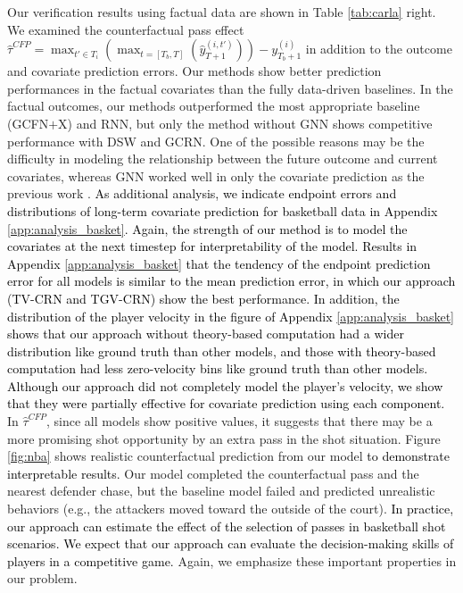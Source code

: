\documentclass[journal]{IEEEtran}
\begin{document}
Our verification results using factual data are shown in Table \ref{tab:carla} right.
We examined the counterfactual pass effect $\hat{\tau}^{CFP} = \max_{t'\in T_i}(\max_{t=[T_b,T]}(\hat{y}^{(i,t')}_{T+1}))-y^{(i)}_{T_b+1}$ in addition to the outcome and covariate prediction errors. 
Our methods show better prediction performances in the factual covariates than the fully data-driven baselines. In the factual outcomes, our methods outperformed the most appropriate baseline (GCFN$+$X) and RNN, but only the method without GNN shows competitive performance with DSW and GCRN.  
One of the possible reasons may be the difficulty in modeling the relationship between the future outcome and current covariates, %
whereas GNN worked well in only the covariate prediction as the previous work \cite{Yeh19}.
\textcolor{black}{As additional analysis, we indicate endpoint errors and distributions of long-term covariate prediction for basketball data in Appendix \ref{app:analysis_basket}. Again, the strength of our method is to model the covariates at the next timestep for interpretability of the model. Results in Appendix \ref{app:analysis_basket} %
that the tendency of the endpoint prediction error for all models is similar to the mean prediction error, in which our approach (TV-CRN and TGV-CRN) show the best performance. In addition, the distribution of the player velocity in the figure of Appendix \ref{app:analysis_basket} %
shows that our approach without theory-based computation had a wider distribution like ground truth than other models, and those with theory-based computation had less zero-velocity bins like ground truth than other models. Although our approach did not completely model the player’s velocity, we show that they were partially effective for covariate prediction using each component.}
In $\hat{\tau}^{CFP}$, since all models show positive values, it suggests that there may be a more promising shot opportunity by an extra pass in the shot situation. %
Figure \ref{fig:nba} shows realistic counterfactual prediction from our model 
\textcolor{black}{to demonstrate interpretable results.}
Our model completed the counterfactual pass and the nearest defender chase, but the baseline model failed and predicted unrealistic behaviors 
(e.g., the attackers moved toward the outside of the court).
\textcolor{black}{In practice, our approach can estimate the effect of the selection of passes in basketball shot scenarios. We expect that our approach can evaluate the decision-making skills of players in a competitive game.}
Again, we emphasize these important properties in our problem. 
\end{document}

